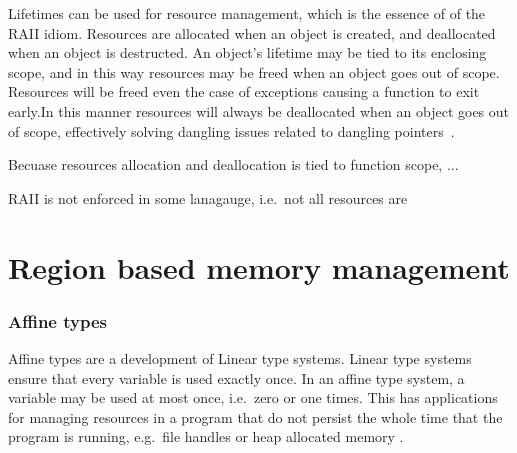 Lifetimes can be used for resource management, which is the essence of of the
RAII idiom. Resources are allocated when an object is created, and deallocated
when an object is destructed. An object's lifetime may be tied to its enclosing
scope, and in this way resources may be freed when an object goes out of scope.
Resources will be freed even the case of exceptions causing a function to exit
early.In this manner resources will always be deallocated when an object goes
out of scope, effectively solving dangling issues related to dangling
pointers~\cite{rust}. 

Becuase resources allocation and deallocation is tied to function scope, ...

RAII is not enforced in some lanagauge, i.e.\ not all resources are 

\section{Region based memory management}

\subsubsection{Affine types}
Affine types are a development of Linear type systems. Linear type systems
ensure that every variable is used exactly once. In an affine type system, a
variable may be used at most once, i.e.\ zero or one times. This has
applications for managing resources in a program that do not persist the whole
time that the program is running, e.g.\ file handles or heap allocated memory
\cite{attapl} \cite{tovAffine}.

